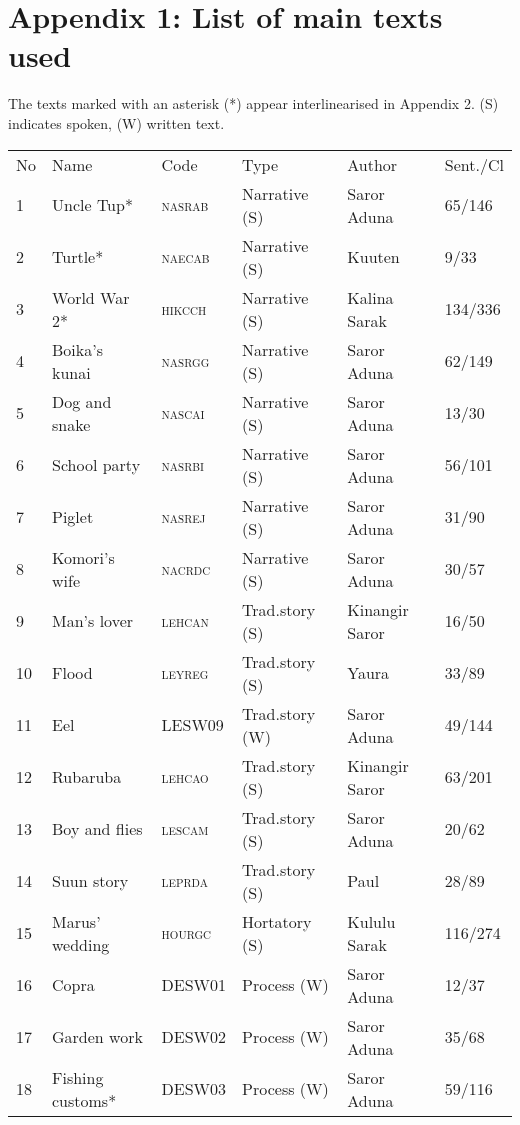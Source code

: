 
\section*{Appendix 1: List of main texts used}


The texts marked with an asterisk (*) appear interlinearised in Appendix 2.
{(S) indicates spoken, (W) written text.}

\begin{tabular}{llllll}
No &  Name & Code & Type & Author & Sent./Cl\\
1 & Uncle Tup* &  \textsc{nasrab} & Narrative (S) &  Saror Aduna &  65/146\\
2 & Turtle*  & \textsc{naecab} & Narrative (S) & Kuuten  & 9/33 \\
3 & World War 2*  & \textsc{hikcch} & Narrative (S) & Kalina Sarak  & 134/336 \\
4 & Boika's kunai  & \textsc{nasrgg} & Narrative (S) & Saror Aduna  & 62/149 \\
5 & Dog and snake  & \textsc{nascai} & Narrative (S) & Saror Aduna  & 13/30 \\
6 & School party  & \textsc{nasrbi} & Narrative (S) & Saror Aduna  & 56/101 \\
7 & Piglet  & \textsc{nasrej} & Narrative (S) & Saror Aduna  & 31/90 \\
8 & Komori's wife  & \textsc{nacrdc} & Narrative (S) & Saror Aduna  & 30/57 \\
9 & Man's lover  & \textsc{lehcan} & Trad.story (S) & Kinangir Saror  & 16/50 \\
10 & Flood  & \textsc{leyreg} & Trad.story (S) & Yaura  & 33/89 \\
11 & Eel  & LESW09 & Trad.story (W) & Saror Aduna  & 49/144 \\
12 & Rubaruba  & \textsc{lehcao} & Trad.story (S) & Kinangir Saror  & 63/201 \\
13 & Boy and flies  & \textsc{lescam} & Trad.story (S) & Saror Aduna  & 20/62 \\
14 & Suun story  & \textsc{leprda} & Trad.story (S) & Paul  & 28/89 \\
15 & Marus' wedding  & \textsc{hourgc} & Hortatory (S) & Kululu Sarak  & 116/274 \\
16 & Copra  & DESW01 & Process (W) & Saror Aduna  & 12/37 \\
17 & Garden work  & DESW02 & Process (W) & Saror Aduna  & 35/68 \\
18 & Fishing customs*  & DESW03 & Process (W) & Saror Aduna  & 59/116 \\

\end{tabular}
